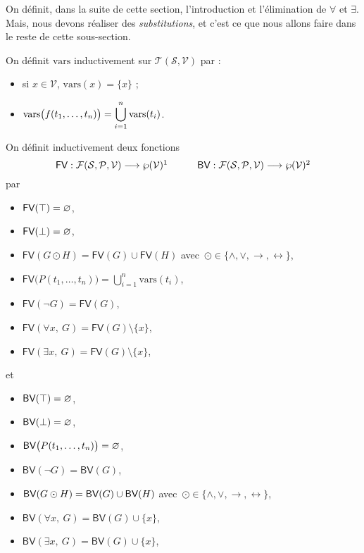 On définit, dans la suite de cette section, l'introduction et l'élimination de $\forall$\/ et $\exists$. Mais, nous devons réaliser des \textit{substitutions}, et c'est ce que nous allons faire dans le reste de cette sous-section.

\begin{defn}
	On définit $\mathrm{vars}$\/ inductivement sur $\mathcal{T}(\mathcal{S}, \mathcal{V})$ par :
	\begin{itemize}
		\item si $x \in \mathcal{V}$, $\mathrm{vars}(x) = \{x\}$\/ ;
		\item $\displaystyle\mathrm{vars}\big(f(t_1, \ldots, t_n)\big) = \bigcup_{i=1}^n \mathrm{vars}(t_i)$.
	\end{itemize}
\end{defn}

\begin{defn}
	On définit inductivement deux fonctions \[
		\textsf{FV} : \mathcal{F}(\mathcal{S}, \mathcal{P}, \mathcal{V}) \longrightarrow \wp(\mathcal{V})\footnotemark
		\quad\quad\quad
		\textsf{BV} : \mathcal{F}(\mathcal{S}, \mathcal{P}, \mathcal{V}) \longrightarrow \wp(\mathcal{V})\footnotemark
	\]
	par
	\begin{multicols}{2}
		\begin{itemize}
			\item $\textsf{FV}(\top) = \varnothing$,
			\item $\textsf{FV}(\bot) = \varnothing$,
			\item $\textsf{FV}(G\odot H) = \textsf{FV}(G) \cup \textsf{FV}(H)$ avec~$\odot \in \{\land, \lor, \to, \leftrightarrow\}$,
			\item $\textsf{FV}\big(P(t_1, \ldots, t_n)\big) = \bigcup_{i=1}^n \mathrm{vars}(t_i)$,
			\item $\textsf{FV}(\lnot G) = \textsf{FV}(G)$,
			\item $\textsf{FV}(\forall x,\: G) = \textsf{FV}(G) \setminus \{x\}$,
			\item $\textsf{FV}(\exists x,\: G) = \textsf{FV}(G) \setminus \{x\}$,
		\end{itemize}
	\end{multicols}
	et 
	\begin{multicols}{2}
		\begin{itemize}
			\item $\textsf{BV}(\top) = \varnothing$,
			\item $\textsf{BV}(\bot) = \varnothing$,
			\item $\displaystyle\textsf{BV}\big(P(t_1, \ldots, t_n)\big) = \varnothing$,
			\item $\textsf{BV}(\lnot G) = \textsf{BV}(G)$,
			\item $\displaystyle\textsf{BV}(G\odot H) = \textsf{BV}(G) \cup \textsf{BV}(H)$ avec~$\odot \in \{\land, \lor, \to, \leftrightarrow\}$,
			\item $\textsf{BV}(\forall x,\: G) = \textsf{BV}(G) \cup \{x\}$,
			\item $\textsf{BV}(\exists x,\: G) = \textsf{BV}(G) \cup \{x\}$,
		\end{itemize}
	\end{multicols}
\end{defn}

